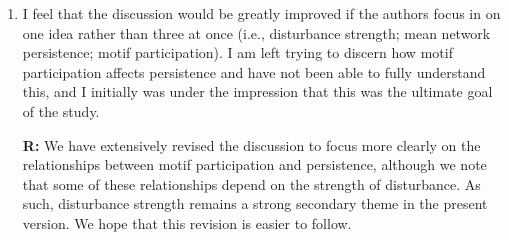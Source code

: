 \documentclass[12pt]{article}
\begin{document}
\begin{enumerate}
            \item I feel that the discussion would be greatly improved if the authors focus in on one idea rather than three at once (i.e., disturbance strength; mean network persistence; motif participation). I am left trying to discern how motif participation affects persistence and have not been able to fully understand this, and I initially was under the impression that this was the ultimate goal of the study.

                \textbf{R:} We have extensively revised the discussion to focus more clearly on the relationships between motif participation and persistence, although we note that some of these relationships depend on the strength of disturbance. As such, disturbance strength remains a strong secondary theme in the present version. We hope that this revision is easier to follow.


        \end{enumerate}

\clearpage

     
\end{document}
